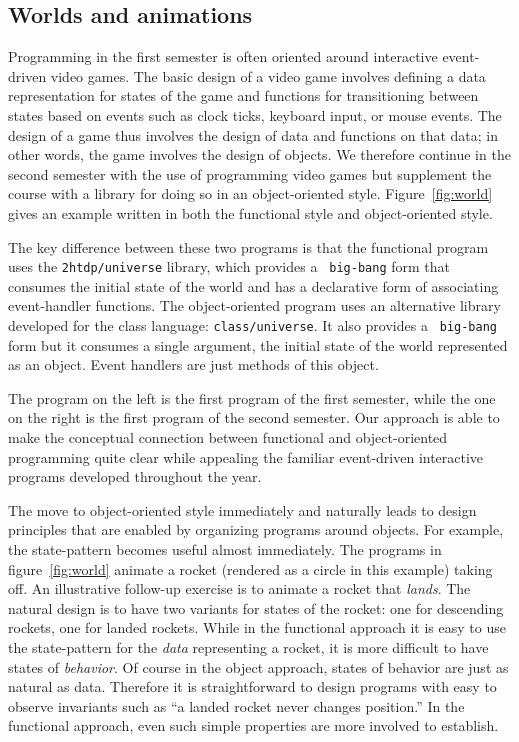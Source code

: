 \documentclass[submission,copyright]{eptcs}
\begin{document}



\subsection{Worlds and animations}

Programming in the first semester is often oriented around interactive
event-driven video games.  The basic design of a video game involves
defining a data representation for states of the game and functions
for transitioning between states based on events such as clock ticks,
keyboard input, or mouse events.  The design of a game thus involves
the design of data and functions on that data; in other words, the
game involves the design of objects.  We therefore continue in the
second semester with the use of programming video games but supplement
the course with a library for doing so in an object-oriented style.
Figure~\ref{fig:world} gives an example written in both the functional
style and object-oriented style.

The key difference between these two programs is that the functional
program uses the {\tt 2htdp/universe} library, which provides a {\tt
  big-bang} form that consumes the initial state of the world and has
a declarative form of associating event-handler functions.  The
object-oriented program uses an alternative library developed for the
class language: {\tt class/universe}.  It also provides a {\tt
  big-bang} form but it consumes a single argument, the initial state
of the world represented as an object.  Event handlers are just
methods of this object.

The program on the left is the first program of the first semester,
while the one on the right is the first program of the second
semester.  Our approach is able to make the conceptual connection
between functional and object-oriented programming quite clear while
appealing the familiar event-driven interactive programs developed
throughout the year.

The move to object-oriented style immediately and naturally leads to
design principles that are enabled by organizing programs around
objects.  For example, the state-pattern becomes useful almost
immediately.  The programs in figure~\ref{fig:world} animate a rocket
(rendered as a circle in this example) taking off.  An illustrative
follow-up exercise is to animate a rocket that \emph{lands}.  The
natural design is to have two variants for states of the rocket: one
for descending rockets, one for landed rockets.  While in the
functional approach it is easy to use the state-pattern for the
\emph{data} representing a rocket, it is more difficult to have states
of \emph{behavior}.  Of course in the object approach, states of
behavior are just as natural as data.  Therefore it is straightforward
to design programs with easy to observe invariants such as ``a landed
rocket never changes position.''  In the functional approach, even such
simple properties are more involved to establish.
\end{document}

